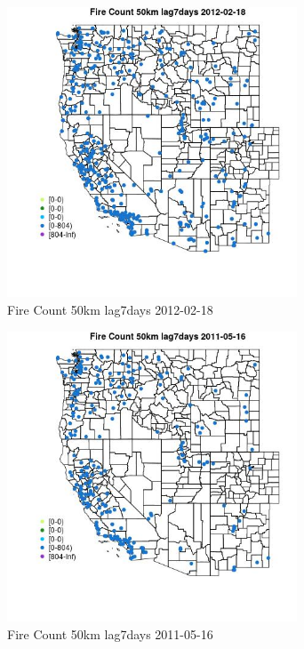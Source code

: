 \begin{figure} 
\centering  
\includegraphics[width=0.77\textwidth]{Code_Outputs/Report_ML_input_PM25_Step4_part_f_de_duplicated_aves_prioritize_24hr_obswNAs_MapObsFire_Count_50km_lag7days2012-02-18.jpg} 
\caption{\label{fig:Report_ML_input_PM25_Step4_part_f_de_duplicated_aves_prioritize_24hr_obswNAsMapObsFire_Count_50km_lag7days2012-02-18}Fire Count 50km lag7days 2012-02-18} 
\end{figure} 
 

\begin{figure} 
\centering  
\includegraphics[width=0.77\textwidth]{Code_Outputs/Report_ML_input_PM25_Step4_part_f_de_duplicated_aves_prioritize_24hr_obswNAs_MapObsFire_Count_50km_lag7days2011-05-16.jpg} 
\caption{\label{fig:Report_ML_input_PM25_Step4_part_f_de_duplicated_aves_prioritize_24hr_obswNAsMapObsFire_Count_50km_lag7days2011-05-16}Fire Count 50km lag7days 2011-05-16} 
\end{figure} 
 

